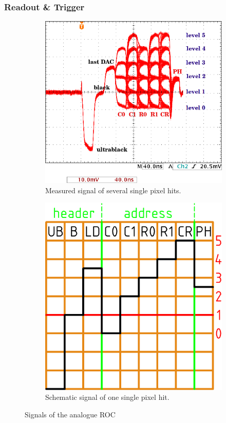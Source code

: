 \documentclass[british,11pt,a4paper]{memoir}
\begin{document}
\subsubsection{Readout \& Trigger}\label{sread}
\begin{figure}[ht]
	\centering
	\begin{subfigure}[b]{0.47\textwidth}
        \includegraphics[width=\textwidth]{siganalog}
		\caption{Measured signal of several single pixel hits.}
		\label{panasig}
	\end{subfigure}
	\hfill
	\begin{subfigure}[b]{0.47\textwidth}
		\includegraphics[width=\textwidth]{levels}
		\caption{Schematic signal of one single pixel hit.}
		\label{p7}
	\end{subfigure}
	\caption{Signals of the analogue \ac{ROC}}
	\label{procsig}
\end{figure}
\end{document}

